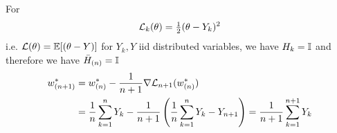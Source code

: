 \begin{example}
	For
	\begin{align}
		\mathcal{L}_k(\theta) = \tfrac12(\theta - Y_k)^2
	\end{align}	
	i.e. \(\mathcal{L}(\theta) = \mathbb{E}[(\theta - Y)]\) for \(Y_k, Y\) iid distributed
	variables, we have \(H_k = \mathbb{I}\) and therefore we have \(\bar{H}_{(n)}=\mathbb{I}\)
	\begin{align*}
		w^*_{(n+1)}
		&= w^*_{(n)} - \frac1{n+1}\nabla\mathcal{L}_{n+1}(w^*_{(n)})\\
		&= \frac1n\sum_{k=1}^n Y_k - \frac1{n+1}\left(\frac1n\sum_{k=1}^n Y_k - Y_{n+1}\right)
		= \frac1{n+1}\sum_{k=1}^{n+1} Y_k
	\end{align*}
\end{example}